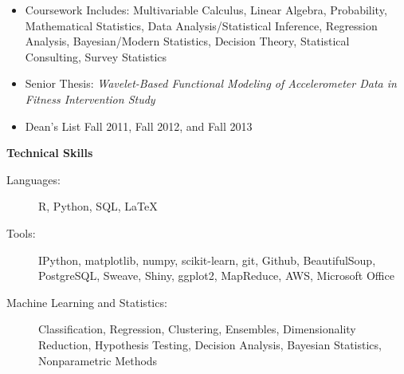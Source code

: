 \documentclass[letterpaper,12pt]{article}
\newcommand{\resitem}[1]{\item #1 \vspace{-2pt}}
\newcommand{\resheading}[1]{{\large \colorbox{mygrey}{\begin{minipage}{\textwidth}{\textbf{#1 \vphantom{p\^{E}}}}\end{minipage}}}}
\begin{document}
				{ \footnotesize
				\begin{itemize}
					\resitem{Coursework Includes: Multivariable Calculus, Linear Algebra, Probability, Mathematical Statistics, Data Analysis/Statistical Inference, Regression Analysis, Bayesian/Modern Statistics, Decision Theory, Statistical Consulting, Survey Statistics}
					\resitem{Senior Thesis: \textit{Wavelet-Based Functional Modeling of Accelerometer Data in Fitness Intervention Study}} 
					\resitem{Dean's List Fall 2011, Fall 2012, and Fall 2013} 
				\end{itemize}


\resheading{Technical Skills}
	\begin{description}
		\item[Languages:] { \footnotesize R, Python, SQL, \LaTeX
		}
		\item[Tools:] { \footnotesize IPython, matplotlib, numpy, scikit-learn, git, Github, BeautifulSoup, PostgreSQL, Sweave, Shiny, ggplot2, MapReduce, AWS, Microsoft Office
		}
		\item[Machine Learning and Statistics:] { \footnotesize Classification, Regression, Clustering, Ensembles, Dimensionality Reduction, Hypothesis Testing, Decision Analysis, Bayesian Statistics, Nonparametric Methods
		}
	\end{description} %

}
\end{document}
